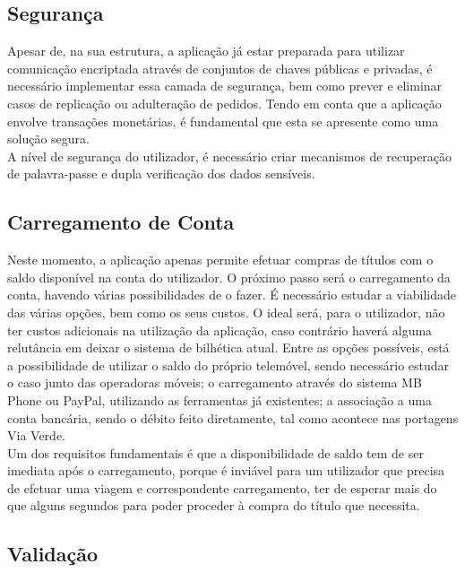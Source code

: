\subsection{Segurança}

Apesar de, na sua estrutura, a aplicação já estar preparada para utilizar comunicação encriptada através de conjuntos de chaves públicas e privadas, é necessário implementar essa camada de segurança, bem como prever e eliminar casos de replicação ou adulteração de pedidos. Tendo em conta que a aplicação envolve transações monetárias, é fundamental que esta se apresente como uma solução segura.
\\A nível de segurança do utilizador, é necessário criar mecanismos de recuperação de palavra-passe e dupla verificação dos dados sensíveis.

\subsection{Carregamento de Conta}

Neste momento, a aplicação apenas permite efetuar compras de títulos com o saldo disponível na conta do utilizador. O próximo passo será o carregamento da conta, havendo várias possibilidades de o fazer. É necessário estudar a viabilidade das várias opções, bem como os seus custos. O ideal será, para o utilizador, não ter custos adicionais na utilização da aplicação, caso contrário haverá alguma relutância em deixar o sistema de bilhética atual. Entre as opções possíveis, está a possibilidade de utilizar o saldo do próprio telemóvel, sendo necessário estudar o caso junto das operadoras móveis; o carregamento através do sistema MB Phone ou PayPal, utilizando as ferramentas já existentes; a associação a uma conta bancária, sendo o débito feito diretamente, tal como acontece nas portagens Via Verde.
\\Um dos requisitos fundamentais é que a disponibilidade de saldo tem de ser imediata após o carregamento, porque é inviável para um utilizador que precisa de efetuar uma viagem e correspondente carregamento, ter de esperar mais do que alguns segundos para poder proceder à compra do título que necessita.

\subsection{Validação}

